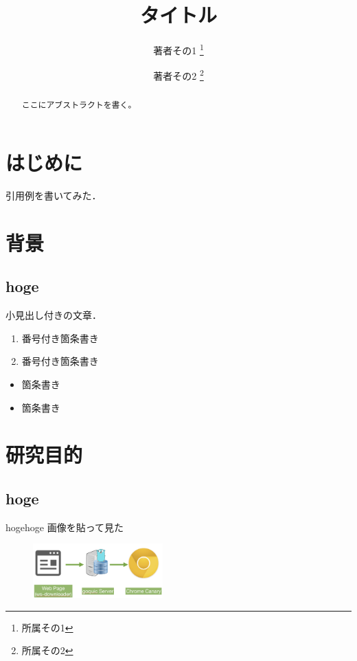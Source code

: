 \documentclass[a4j,10pt]{jsarticle}
\begin{document}

\title{タイトル}

\author{
    著者その1 \thanks{所属その1}
    \and
    著者その2 \thanks{所属その2}
}

\begin{abstract}
ここにアブストラクトを書く。
\end{abstract}

\maketitle
\thispagestyle{empty}

\section{はじめに}

引用例\cite{example}を書いてみた．

\section{背景}

\subsection{hoge}
小見出し付きの文章．

\begin{enumerate}
\item 番号付き箇条書き 
\item 番号付き箇条書き
\end{enumerate}

\begin{itemize}
\item 箇条書き
\item 箇条書き
\end{itemize}


\section{研究目的}

\subsection{hoge}
hogehoge
画像を貼って見た

\begin{figure}[htbp]
    \includegraphics[width=5cm]{figure1.png}
    \caption{}
\end{figure}
 
\end{document}
